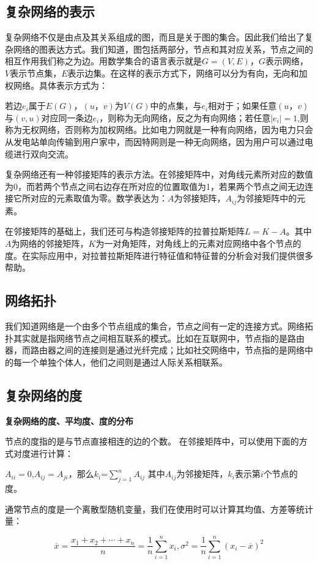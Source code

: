 \documentclass[a4paper,12pt,openany,oneside,utf-8]{ctexbook}
\begin{document}
	\subsection{复杂网络的表示}
    复杂网络不仅是由点及其关系组成的图，而且是关于图的集合。因此我们给出了复杂网络的图表达方式。我们知道，图包括两部分，节点和其对应关系，节点之间的相互作用我们称之为边。用数学集合的语言表示就是$G=(V,E)$，$G$表示网络，$V$表示节点集，$E$表示边集。在这样的表示方式下，网络可以分为有向，无向和加权网络。具体表示方式为：
	
    若边$e_{i}$属于$E(G)$，$(u，v)$为$V(G)$中的点集，与$e_{i}$相对于；如果任意$(u，v)$与$(v,u)$对应同一条边$e_{i}$，则称为无向网络，反之为有向网络；若任意$|e_{i}|=1$,则称为无权网络，否则称为加权网络。比如电力网就是一种有向网络，因为电力只会从发电站单向传输到用户家中，而因特网则是一种无向网络，因为用户可以通过电缆进行双向交流。
    
    复杂网络还有一种邻接矩阵的表示方法。在邻接矩阵中，对角线元素所对应的数值为0，而若两个节点之间右边存在所对应的位置取值为1，若果两个节点之间无边连接它所对应的元素取值为零。数学表达为：$A$为邻接矩阵，$A_{ij}$为邻接矩阵中的元素。
    
    在邻接矩阵的基础上，我们还可与构造邻接矩阵的拉普拉斯矩阵$L=K-A$。其中$A$为网络的邻接矩阵，$K$为一对角矩阵，对角线上的元素对应网络中各个节点的度。在实际应用中，对拉普拉斯矩阵进行特征值和特征普的分析会对我们提供很多帮助。
	\subsection{网络拓扑}
	我们知道网络是一个由多个节点组成的集合，节点之间有一定的连接方式。网络拓扑其实就是指网络节点之间相互联系的模式。比如在互联网中，节点指的是路由器，而路由器之间的连接则是通过光纤完成；比如社交网络中，节点指的是网络中的每一个单独个体人，他们之间则是通过人际关系相联系。
	\subsection{复杂网络的度}
	\textbf{复杂网络的度、平均度、度的分布}
	
	节点的度指的是与节点直接相连的边的个数。
	在邻接矩阵中，可以使用下面的方式对度进行计算：
	
	$A_{ii}=0$,$A_{ij}=A_{ji}$，那么$k_{i}$=$\sum_{j=1}^{n}A_{ij}$
	其中$A_{ij}$为邻接矩阵，$k_{i}$表示第$i$个节点的度。
	
	通常节点的度是一个离散型随机变量，我们在使用时可以计算其均值、方差等统计量：
	
	\begin{equation}
	\overline{x}=\frac{x_{1}+x_{2}+\cdots +x_{n}}{n}=\frac{1}{n}\sum_{i=1}^{n}x_{i},
	\sigma^{2}=\frac{1}{n}\sum_{i=1}^{n}{(x_i - \overline{x})^2}
	\end{equation}
	
\end{document}
